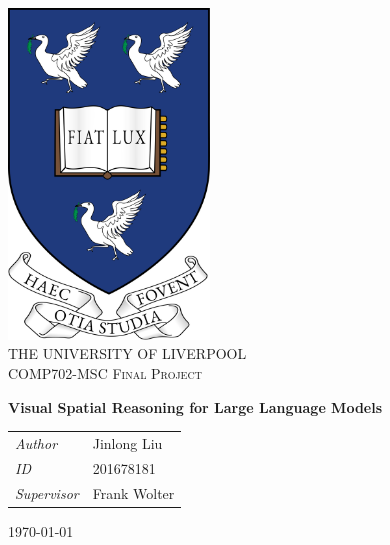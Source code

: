 \begin{titlepage}
\vbox{ }
\vbox{ }
\begin{center}

\includegraphics[width=0.40\textwidth]{liverpool.png}\\[1cm]

\textsc{\LARGE THE UNIVERSITY OF LIVERPOOL}\\[1.5cm]
\textsc{\Large COMP702-MSC Final Project}\\[0.5cm]
\vbox{ }



\huge \bfseries Visual Spatial Reasoning for Large Language Models\\[0.4cm]


\begin{table}[h]
\large
    \centering
    \begin{tabular}{ll}
        \emph{Author} & Jinlong Liu \\
        \emph{ID} & 201678181\\
        \emph{Supervisor} &  Frank Wolter \\
    \end{tabular}
\end{table}

\vfill
{\large \today}
\end{center}
\end{titlepage}